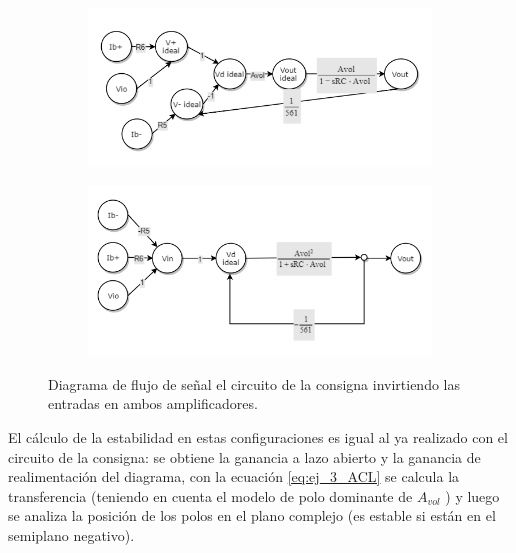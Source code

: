 \documentclass[../../main.tex]{subfiles}
\begin{document}
\begin{figure}[h]%
	\centering
	\begin{subfigure}[t]{0.49\textwidth}
		\centering
		\includegraphics[width=\textwidth]{imagenes/signal_flow_inv_ambos.png}
		\caption{}
		\label{fig:ej_3_signal_flow_inv_ambos_no_simplificado}
	\end{subfigure}%
	\hfill%
	\begin{subfigure}[t]{0.49\textwidth}
		\centering
		\includegraphics[width=\textwidth]{imagenes/signal_flow_inv_ambos_simplificado.png}
		\caption{}
		\label{fig:ej_3_signal_flow_inv_ambos_simplificado}
	\end{subfigure}
	\label{fig:ej_3_signal_flow_inv_ambos}	
	\caption{Diagrama de flujo de se\~nal el circuito de la consigna invirtiendo las entradas en ambos amplificadores.}
\end{figure}

El c\'alculo de la estabilidad en estas configuraciones es igual al ya realizado con el circuito de la consigna: se obtiene la ganancia a lazo abierto y la ganancia de realimentaci\'on del diagrama, con la ecuaci\'on \ref{eq:ej_3_ACL} se calcula la transferencia (teniendo en cuenta el modelo de polo dominante de $A_{vol}$ ) y luego se analiza la posici\'on de los polos en el plano complejo (es estable si est\'an en el semiplano negativo).
\end{document}
